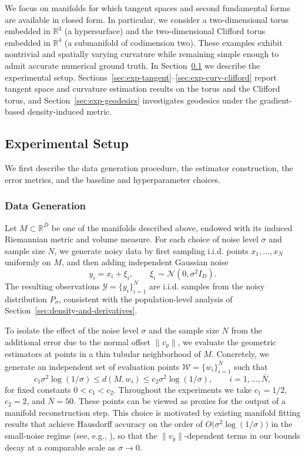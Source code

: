 \documentclass[11pt]{article}
\theoremstyle{plain}
\theoremstyle{definition}
\begin{document}
We focus on manifolds for which tangent spaces and second fundamental forms are available in closed form. In particular, we consider a two-dimensional torus embedded in $\mathbb{R}^3$ (a hypersurface) and the two-dimensional Clifford torus embedded in $\mathbb{R}^4$ (a submanifold of codimension two). These examples exhibit nontrivial and spatially varying curvature while remaining simple enough to admit accurate numerical ground truth. In Section~\ref{sec:exp-setup} we describe the experimental setup. Sections~\ref{sec:exp-tangent}--\ref{sec:exp-curv-clifford} report tangent space and curvature estimation results on the torus and the Clifford torus, and Section~\ref{sec:exp-geodesics} investigates geodesics under the gradient-based density-induced metric.

\subsection{Experimental Setup}
\label{sec:exp-setup}
We first describe the data generation procedure, the estimator construction, the error metrics, and the baseline and hyperparameter choices.
\subsubsection{Data Generation} Let $M \subset \mathbb{R}^D$ be one of the manifolds described above, endowed with its induced Riemannian metric and volume measure. For each choice of noise level $\sigma$ and sample size $N$, we generate noisy data by first sampling i.i.d. points $x_1,\dots,x_N$ uniformly on $M$, and then adding independent Gaussian noise
\[
  y_i = x_i + \xi_i, \qquad \xi_i \sim \mathcal{N}(0,\sigma^2 I_D).
\]
The resulting observations $\mathcal{Y} = \{y_i\}_{i=1}^N $ are i.i.d. samples from the noisy distribution $P_\sigma$, consistent with the population-level analysis of Section~\ref{sec:density-and-derivatives}.

To isolate the effect of the noise level $\sigma$ and the sample size $N$ from the additional error due to the normal offset $\|v_y\|$, we evaluate the geometric estimators at points in a thin tubular neighborhood of $M$. Concretely, we generate an independent set of evaluation points $\mathcal W = \{w_i\}_{i=1}^{\bar{N}}$ such that
\[
  c_1 \sigma^2 \log(1/\sigma)
  \leq
  d(M,w_i)
  \leq
  c_2 \sigma^2 \log(1/\sigma),
  \qquad i=1,\ldots,\bar{N},
\]
for fixed constants $0 < c_1 < c_2$. Throughout the experiments we take $c_1 = 1/2$, $c_2 = 2$, and $\bar{N} = 50$.
These points can be viewed as proxies for the output of a manifold reconstruction step. This choice is motivated by existing manifold fitting results that achieve Hausdorff accuracy on the order of $O\big(\sigma^2\log(1/\sigma)\big)$ in the small-noise regime (see, e.g., \citealp{Genovese2014Ridge, yao2023manifold}), so that the $\|v_y\|$-dependent terms in our bounds decay at a comparable scale as $\sigma\to 0$.
\end{document}
